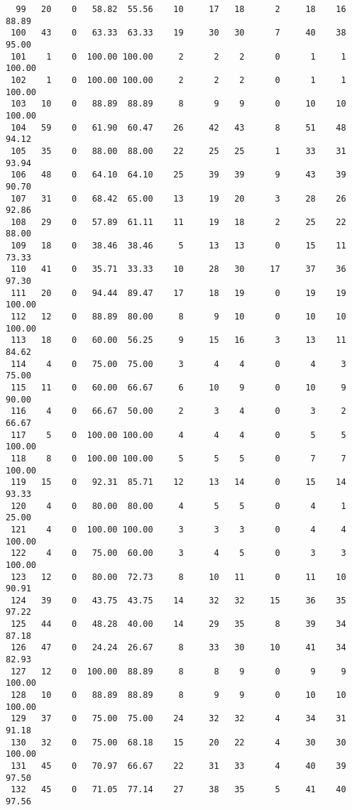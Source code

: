 \begin{verbatim}
  99   20    0   58.82  55.56    10     17   18      2     18    16    88.89
 100   43    0   63.33  63.33    19     30   30      7     40    38    95.00
 101    1    0  100.00 100.00     2      2    2      0      1     1   100.00
 102    1    0  100.00 100.00     2      2    2      0      1     1   100.00
 103   10    0   88.89  88.89     8      9    9      0     10    10   100.00
 104   59    0   61.90  60.47    26     42   43      8     51    48    94.12
 105   35    0   88.00  88.00    22     25   25      1     33    31    93.94
 106   48    0   64.10  64.10    25     39   39      9     43    39    90.70
 107   31    0   68.42  65.00    13     19   20      3     28    26    92.86
 108   29    0   57.89  61.11    11     19   18      2     25    22    88.00
 109   18    0   38.46  38.46     5     13   13      0     15    11    73.33
 110   41    0   35.71  33.33    10     28   30     17     37    36    97.30
 111   20    0   94.44  89.47    17     18   19      0     19    19   100.00
 112   12    0   88.89  80.00     8      9   10      0     10    10   100.00
 113   18    0   60.00  56.25     9     15   16      3     13    11    84.62
 114    4    0   75.00  75.00     3      4    4      0      4     3    75.00
 115   11    0   60.00  66.67     6     10    9      0     10     9    90.00
 116    4    0   66.67  50.00     2      3    4      0      3     2    66.67
 117    5    0  100.00 100.00     4      4    4      0      5     5   100.00
 118    8    0  100.00 100.00     5      5    5      0      7     7   100.00
 119   15    0   92.31  85.71    12     13   14      0     15    14    93.33
 120    4    0   80.00  80.00     4      5    5      0      4     1    25.00
 121    4    0  100.00 100.00     3      3    3      0      4     4   100.00
 122    4    0   75.00  60.00     3      4    5      0      3     3   100.00
 123   12    0   80.00  72.73     8     10   11      0     11    10    90.91
 124   39    0   43.75  43.75    14     32   32     15     36    35    97.22
 125   44    0   48.28  40.00    14     29   35      8     39    34    87.18
 126   47    0   24.24  26.67     8     33   30     10     41    34    82.93
 127   12    0  100.00  88.89     8      8    9      0      9     9   100.00
 128   10    0   88.89  88.89     8      9    9      0     10    10   100.00
 129   37    0   75.00  75.00    24     32   32      4     34    31    91.18
 130   32    0   75.00  68.18    15     20   22      4     30    30   100.00
 131   45    0   70.97  66.67    22     31   33      4     40    39    97.50
 132   45    0   71.05  77.14    27     38   35      5     41    40    97.56

\end{verbatim}
